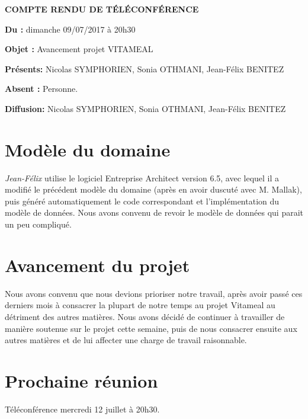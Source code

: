 \documentclass[11pt,a4paper,french,twoside,openright]{article}
\begin{document}
\pagestyle{fancy}

\begin{center}\bfseries\Huge
COMPTE RENDU DE TÉLÉCONFÉRENCE
\end{center}

\textbf{Du      :} dimanche 09/07/2017 à 20h30

\textbf{Objet   :} Avancement projet VITAMEAL

\textbf{Présents:} Nicolas SYMPHORIEN, Sonia OTHMANI, Jean-Félix BENITEZ

\textbf{Absent :} Personne.

\textbf{Diffusion:} Nicolas SYMPHORIEN, Sonia OTHMANI, Jean-Félix BENITEZ

\hrulefill

\section{Modèle du domaine}
\emph{Jean-Félix} utilise le logiciel Entreprise Architect version 6.5, avec lequel il a modifié le précédent modèle du domaine (après en avoir duscuté avec M. Mallak), puis généré automatiquement le code correspondant et l'implémentation du modèle de données. Nous avons convenu de revoir le modèle de données qui parait un peu compliqué.

\section{Avancement du projet}
Nous avons convenu que nous devions prioriser notre travail, après avoir passé ces derniers mois à consacrer la plupart de notre temps au projet Vitameal au détriment des autres matières. Nous avons décidé de continuer à travailler de manière soutenue sur le projet cette semaine, puis de nous consacrer ensuite aux autres matières et de lui affecter une charge de travail raisonnable.

\section{Prochaine réunion}
Téléconférence mercredi 12  juillet à 20h30.

\label{LastPage}
\end{document}
